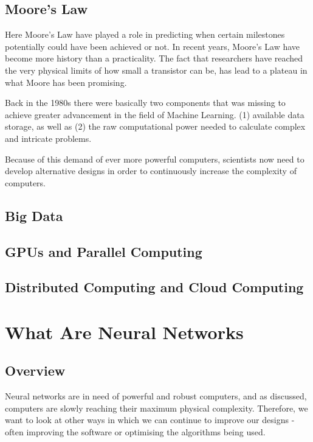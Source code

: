 \documentclass[
a4paper,
11pt,
english
]{report}
\begin{document}
\subsection{Moore's Law}
Here Moore's Law have played a role in predicting when certain milestones potentially could have been achieved or not. In recent years, Moore's Law have become more history than a practicality. The fact that researchers have reached the very physical limits of how small a transistor can be, has lead to a plateau in what Moore has been promising.

Back in the 1980s there were basically two components that was missing to achieve greater advancement in the field of Machine Learning. (1) available data storage, as well as (2) the raw computational power needed to calculate complex and intricate problems.

Because of this demand of ever more powerful computers, scientists now need to develop alternative designs in order to continuously increase the complexity of computers.

\subsection{Big Data}
\subsection{GPUs and Parallel Computing}
\subsection{Distributed Computing and Cloud Computing}


\clearpage
\section{What Are Neural Networks}

\subsection{Overview}
Neural networks are in need of powerful and robust computers, and as discussed, computers are slowly reaching their maximum physical complexity. Therefore, we want to look at other ways in which we can continue to improve our designs - often improving the software or optimising the algorithms being used.
\end{document}
